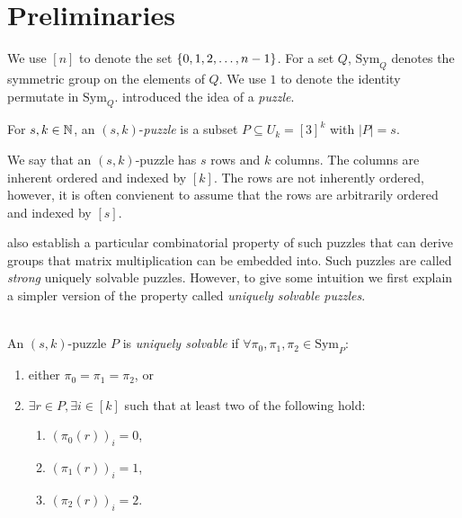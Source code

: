 \documentclass[11pt]{article}
\newcommand\sse{\subseteq}
\newcommand\Sym[1]{\ensuremath{\mathrm{Sym}_{#1}}}
\begin{document}
\section{Preliminaries}
\label{sec:prelim}

\newcommand\ordset[1]{\ensuremath{[#1]}}

We use $\ordset{n}$ to denote the set $\left\{ 0,1,2,\ldots, n-1 \right\}$.  For
a set $Q$, $\Sym{Q}$ denotes the symmetric group on the elements of
$Q$.  We use $1$ to denote the identity permutate in
$\Sym{Q}$. \cite{cksu05} introduced the idea of a \emph{puzzle}.

\begin{definition}[Puzzle]
  For $s, k \in \mathbb{N}$, an $(s,k)$-\emph{puzzle} is a
  subset $P \sse U_k = \ordset{3}^k$ with $|P| = s$.
\end{definition}

We say that an $(s,k)$-puzzle has $s$ rows and $k$ columns.  The
columns are inherent ordered and indexed by $\ordset{k}$.  The rows
are not inherently ordered, however, it is often convienent to assume
that the rows are arbitrarily ordered and indexed by $\ordset{s}$.

\cite{cksu05} also establish a particular combinatorial property of
such puzzles that can derive groups that matrix multiplication can be
embedded into.  Such puzzles are called \emph{strong} uniquely
solvable puzzles.  However, to give some intuition we first explain a
simpler version of the property called \emph{uniquely solvable
  puzzles}.

\begin{definition}
  \label{def:strong-USP}
  ~\\An $(s,k)$-puzzle $P$ is \emph{uniquely solvable} if
  $\forall \pi_0, \pi_1, \pi_2 \in \Sym{P}:$
  \begin{enumerate}
  \item either $\pi_0 = \pi_1 = \pi_2$, or
  \item $\exists r \in P, \exists i \in \ordset{k}$ such that at least two
    of the following hold:
    \begin{enumerate}
    \item $(\pi_0(r))_i = 0$,
    \item $(\pi_1(r))_i = 1$,
    \item $(\pi_2(r))_i = 2$.
    \end{enumerate}
  \end{enumerate}
\end{definition}
\end{document}
